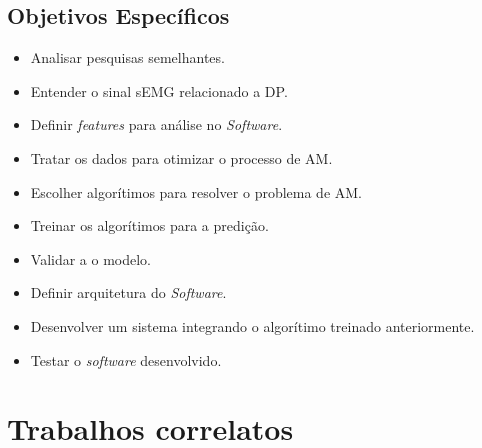 \subsection{Objetivos Específicos}
\begin{itemize}
    \item Analisar pesquisas semelhantes.
    \item Entender o sinal sEMG relacionado a DP.
    \item Definir \textit{features} para análise no \textit{Software}.
    \item Tratar os dados para otimizar o processo de AM.
    \item Escolher algorítimos para resolver o problema de AM.
    \item Treinar os algorítimos para a predição.
    \item Validar a o modelo.
    \item Definir arquitetura do \textit{Software}.
    \item Desenvolver um sistema integrando o algorítimo treinado anteriormente.
    \item Testar o \textit{software} desenvolvido.
\end{itemize}
\section{Trabalhos correlatos}